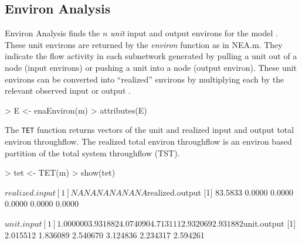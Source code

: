 \documentclass[article]{jss}
\begin{document}
\subsection{Environ Analysis}
Environ Analysis finds the $n$ \emph{unit} input and output environs
for the model \citep{patten78,fath99_review}.  These unit environs are
returned by the \textit{environ} function as in NEA.m.  They indicate the flow
activity in each subnetwork generated by pulling a unit out of a node
(input environs) or pushing a unit into a node (output environ). These
unit environs can be converted into ``realized'' environs by
multiplying each by the relevant observed input or output \citep{borrett11_ree}.

\begin{Schunk}
\begin{Sinput}
> E <- enaEnviron(m)
> attributes(E)
\end{Sinput}
\end{Schunk}

The \texttt{TET} function returns vectors of the unit and realized
input and output total environ throughflow.  The realized total
environ throughflow is an environ based partition of the total system
throughflow (TST).

\begin{Schunk}
\begin{Sinput}
> tet <- TET(m)
> show(tet)
\end{Sinput}
\begin{Soutput}
$realized.input
[1] NA NA NA NA NA NA

$realized.output
[1] 83.5833  0.0000  0.0000  0.0000  0.0000  0.0000

$unit.input
[1] 1.000000 3.931882 4.074090 4.713111 2.932069 2.931882

$unit.output
[1] 2.015512 1.836089 2.540670 3.124836 2.234317 2.594261
\end{Soutput}
\end{Schunk}
\end{document}
